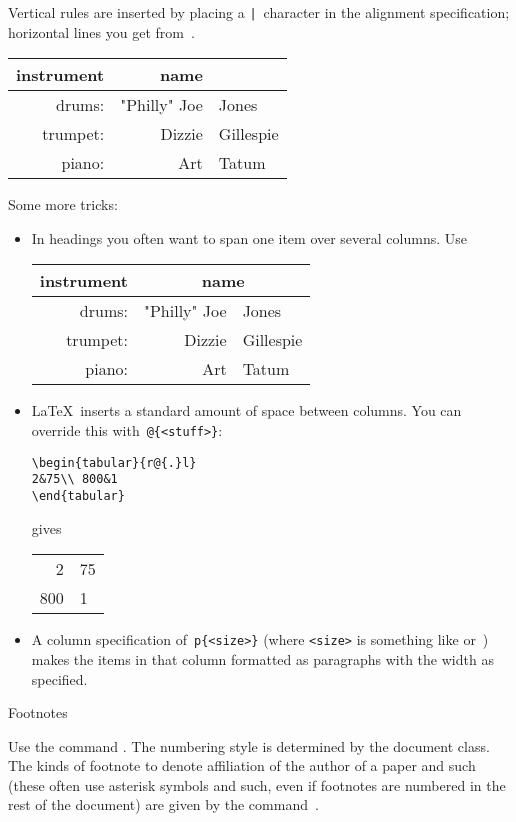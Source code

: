 Vertical rules are inserted by placing a \verb+|+~character in the
alignment specification; horizontal lines you get
from~.

\begin{examplewithcode}
\begin{tabular}{|r|rl|}
\hline
instrument&name&\\ \hline
drums: &"Philly" Joe & Jones\\
trumpet:& Dizzie & Gillespie\\ 
piano: &Art&Tatum\\ \hline
\end{tabular}
\end{examplewithcode}

Some more tricks:
\begin{itemize}
\item In headings you often want to span one item over several
  columns. Use
\begin{examplewithcode}
\begin{tabular}{|r|rl|}
\hline
instrument&\multicolumn{2}{|c|}{name}\\ \hline
drums: &"Philly" Joe & Jones\\
trumpet:& Dizzie & Gillespie\\ 
piano: &Art&Tatum\\ \hline
\end{tabular}
\end{examplewithcode}
\item \LaTeX\ inserts a standard amount of space between columns. You
  can override this with~\verb+@{<stuff>}+: 
\begin{verbatim}
\begin{tabular}{r@{.}l}
2&75\\ 800&1
\end{tabular}
\end{verbatim}
\medskip gives\ %
\begin{tabular}{r@{.}l}
2&75\\ 800&1
\end{tabular}
\item A column specification of~\verb+p{<size>}+ (where \verb+<size>+
  is something like \n{5.08cm} or~\n{2in}) makes the items in that
  column formatted as paragraphs with the width as specified.
\end{itemize}

 {Footnotes}

Use the command . The numbering style is determined
by the document class. The kinds of footnote to denote affiliation of the
author of a paper and such (these often use asterisk symbols and such,
even if footnotes are numbered in the rest of the document) are given
by the command~.

